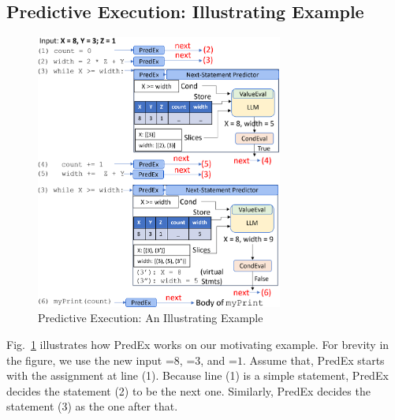 
\subsection{Predictive Execution: Illustrating Example}
\label{sec:example}


\begin{figure}
\begin{center}
\includegraphics[width=3.2in]{example-4.png}
\vspace{-13pt}
\caption{Predictive Execution: An Illustrating Example}
\label{fig:illustration}
\end{center}
\end{figure}

Fig.~\ref{fig:illustration} illustrates how PredEx works on our
motivating example. For brevity in the figure, we use the new input
=$8$, =$3$, and =$1$. Assume that, PredEx
starts with the assignment at line (1). Because line (1) is a simple
statement, PredEx decides the statement (2) to be the next
one. Similarly, PredEx decides the statement (3) as the one after
that.

